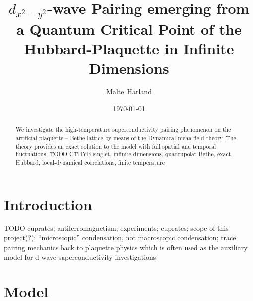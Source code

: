 \documentclass[aps,prb,twocolumn,groupedaddress,amsmath,amssymb]{revtex4-1}
\begin{document}
\title{$d_{x^2-y^2}$-wave Pairing emerging from a Quantum Critical Point of the Hubbard-Plaquette in Infinite Dimensions}
\author{Malte~Harland}
\date{\today}
\begin{abstract}
  We investigate the high-temperature superconductivity pairing phenomenon on the artificial plaquette -- Bethe lattice by means of the Dynamical mean-field theory. The theory provides an exact solution to the model with full spatial and temporal fluctuations. TODO CTHYB singlet, infinite dimensions, quadrupolar Bethe, exact, Hubbard, local-dynamical correlations, finite temperature
\end{abstract}
\maketitle

\section{Introduction}
TODO
cuprates\cite{Damascelli2003};
antiferromagnetism;
experiments; cuprates;
scope of this project(?): ``microscopic'' condensation, not macroscopic condensation;
trace pairing mechanics back to plaquette physics which is often used as the auxiliary model for d-wave superconductivity investigations

\section{Model}
\end{document}
